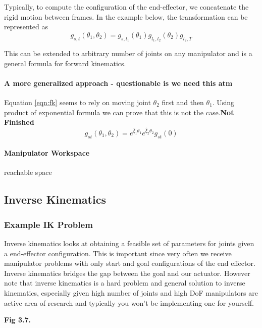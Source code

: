 \documentclass[letterpaper]{article}
\begin{document}
Typically, to compute the configuration of the end-effector, we concatenate the
rigid motion between frames.
In the example below, the transformation can be represented as 
\begin{equation} \label{eqn:fk}
  g_{s,t}(\theta_1, \theta_2) = g_{s, l_1}\left(\theta_1\right)g_{l_1, l_2}(\theta_2)g_{l_2, T}
\end{equation}

This can be extended to arbitrary number of joints on any manipulator and is a 
general formula for forward kinematics. 

\paragraph{A more generalized approach - questionable is we need this atm}
Equation \ref{eqn:fk} seems to rely on moving joint $\theta_2$ first and then $\theta_1$.
Using product of exponential formula we can prove that this is not the case.\textbf{Not Finished}
\begin{equation*}
  g_{st}(\theta_1, \theta_2) = e^{\widehat{\xi}_1\theta_1} e^{\widehat{\xi}_2\theta_2} g_{st}(0)
\end{equation*}

\paragraph{Manipulator Workspace}
reachable space

\subsection{Inverse Kinematics}
\subsubsection{Example IK Problem}
Inverse kinematics looks at obtaining a feasible set of parameters for joints
given a end-effector configuration. This is important since very often we receive
manipulator problems with only start and goal configurations of the end effector.
Inverse kinematics bridges the gap between the goal and our actuator. 
However note that inverse kinematics is a hard problem and general solution to
inverse kinematics, especially given high number of joints and high DoF manipulators
are active area of research and typically you won't be implementing one for yourself.

\textbf{Fig 3.7.}
\end{document}
